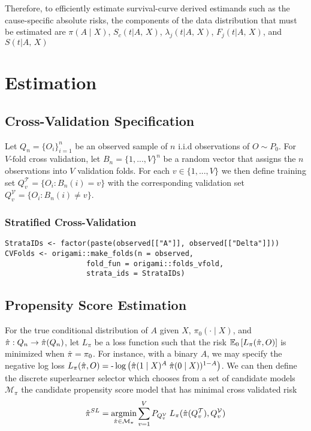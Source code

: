 \documentclass{report}
\newcommand{\1}{\ensuremath{\mathbf{1}}}
\DeclareMathOperator*{\argmin}{argmin}
\newcommand{\X}{\ensuremath{{X}}}
\newcommand{\AX}{\ensuremath{\mid A,\,{X}}}
\newcommand{\g}{\ensuremath{\pi}}
\begin{document}
Therefore, to efficiently estimate survival-curve derived estimands such as the cause-specific absolute risks, the components of the data distribution that must be estimated are \(\g(A \mid \X)\), \(S_c(t \AX)\), \(\lambda_j(t \AX)\), \(F_j(t \AX)\), and \(S(t \AX)\)

\section*{Estimation}
\label{sec:org74b1667}
\subsection*{Cross-Validation Specification}
\label{sec:org3a2066a}
Let \(Q_n = \{O_i\}_{i=1}^n\) be an observed sample of \(n\) i.i.d observations of \(O \sim P_0\). For \(V\text{-fold}\) cross validation, let \(B_n = \{1, ... , V\}^n\) be a random vector that assigns the \(n\) observations into \(V\) validation folds. For each \(v \in \{1, ..., V\}\) we then define training set \(Q^\mathcal{T}_v = \{O_i : B_n(i) = v\}\) with the corresponding validation set \(Q^\mathcal{V}_v = \{O_i : B_n(i) \neq v\}\).

\subsubsection*{Stratified Cross-Validation}
\label{sec:org2510ea3}
\begin{lstlisting}
StrataIDs <- factor(paste(observed[["A"]], observed[["Delta"]]))
CVFolds <- origami::make_folds(n = observed,
			       fold_fun = origami::folds_vfold,
			       strata_ids = StrataIDs)
\end{lstlisting}


\subsection*{Propensity Score Estimation}
\label{sec:org95edd15}
For the true conditional distribution of \(A\) given \(\X\), \(\g_0(\cdot \mid \X)\), and \(\Hat{\g} : Q_n \to \Hat{\g}(Q_n)\), let \(L_\g\) be a loss function such that the risk \(\mathbb{E}_0\left[L_\g(\Hat{\g}, O)\right]\) is minimized when \(\Hat{\g} = \g_0\). For instance, with a binary \(A\), we may specify the negative log loss \(L_\g(\Hat{\g}, O) = \text{-}\log\left(\Hat{\g}(1 \mid \X)^A \; \Hat{\g}(0 \mid \X))^{1-A}\right)\). We can then define the discrete superlearner selector which chooses from a set of candidate models \(\mathcal{M_\g}\) the candidate propensity score model that has minimal cross validated risk 
\[ \Hat{\g}^{SL} = \argmin_{\Hat{\g} \in \mathcal{M}_\g} \sum_{v = 1}^{V} P_{Q^\mathcal{V}_v} \; L_\g(\Hat{\g}(Q^\mathcal{T}_v), Q^\mathcal{V}_v)\]
\end{document}
